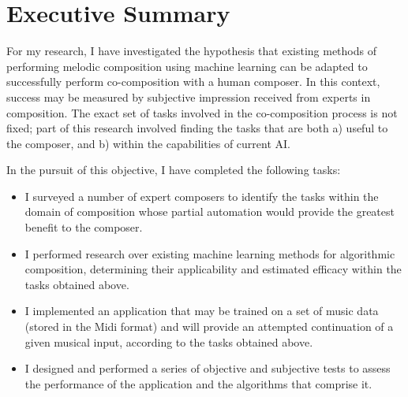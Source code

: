 \documentclass[ author={Stephen Livermore-Tozer},
				supervisor={Dr. Peter Flach},
				degree={MEng},
				title={Performing Algorithmic Co-composition Using Machine Learning},
				subtitle={},
				type={research},
				year={2016} ]{dissertation}
\begin{document}
	
	\maketitle
	
	\frontmatter
	
	\makedecl
	
	\tableofcontents
	\lstlistoflistings
	
	
	\chapter*{Executive Summary}
	
	For my research, I have investigated the hypothesis that existing methods of performing melodic composition using machine learning can be adapted to successfully perform co-composition with a human composer. In this context, success may be measured by subjective impression received from experts in composition. The exact set of tasks involved in the co-composition process is not fixed; part of this research involved finding the tasks that are both a) useful to the composer, and b) within the capabilities of current AI.
	
	In the pursuit of this objective, I have completed the following tasks:
	\begin{itemize}
		\item I surveyed a number of expert composers to identify the tasks within the domain of composition whose partial automation would provide the greatest benefit to the composer.
		\item I performed research over existing machine learning methods for algorithmic composition, determining their applicability and estimated efficacy within the tasks obtained above.
		\item I implemented an application that may be trained on a set of music data (stored in the Midi format) and will provide an attempted continuation of a given musical input, according to the tasks obtained above.
		\item I designed and performed a series of objective and subjective tests to assess the performance of the application and the algorithms that comprise it.
	\end{itemize}
	
	
	
\end{document}
